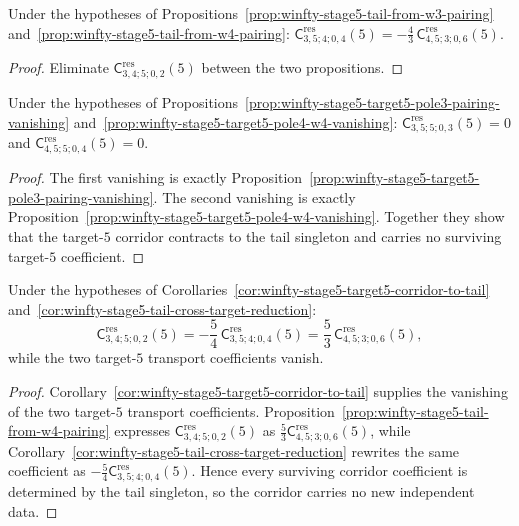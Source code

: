 \begin{corollary}
\label{cor:winfty-stage5-tail-cross-target-reduction}
Under the hypotheses of
Propositions~\ref{prop:winfty-stage5-tail-from-w3-pairing}
and~\ref{prop:winfty-stage5-tail-from-w4-pairing}:
$\mathsf{C}^{\mathrm{res}}_{3,5;4;0,4}(5)
=
-\frac{4}{3}\,
\mathsf{C}^{\mathrm{res}}_{4,5;3;0,6}(5)$.
\end{corollary}

\begin{proof}
Eliminate \(\mathsf{C}^{\mathrm{res}}_{3,4;5;0,2}(5)\) between the two propositions.
\end{proof}

\begin{corollary}
\label{cor:winfty-stage5-target5-corridor-to-tail}
Under the hypotheses of
Propositions~\ref{prop:winfty-stage5-target5-pole3-pairing-vanishing}
and~\ref{prop:winfty-stage5-target5-pole4-w4-vanishing}:
$\mathsf{C}^{\mathrm{res}}_{3,5;5;0,3}(5)=0$ and
$\mathsf{C}^{\mathrm{res}}_{4,5;5;0,4}(5)=0$.
\end{corollary}

\begin{proof}
The first vanishing is exactly
Proposition~\ref{prop:winfty-stage5-target5-pole3-pairing-vanishing}.
The second vanishing is exactly
Proposition~\ref{prop:winfty-stage5-target5-pole4-w4-vanishing}.
Together they show that the target-$5$ corridor contracts to the
tail singleton and carries no surviving target-$5$ coefficient.
\end{proof}

\begin{corollary}
\label{cor:winfty-stage5-target5-no-new-independent-data}
Under the hypotheses of
Corollaries~\ref{cor:winfty-stage5-target5-corridor-to-tail}
and~\ref{cor:winfty-stage5-tail-cross-target-reduction}:
\[
\mathsf{C}^{\mathrm{res}}_{3,4;5;0,2}(5)
=
-\frac{5}{4}\,\mathsf{C}^{\mathrm{res}}_{3,5;4;0,4}(5)
=
\frac{5}{3}\,\mathsf{C}^{\mathrm{res}}_{4,5;3;0,6}(5),
\]
while the two target-$5$ transport coefficients vanish.
\end{corollary}

\begin{proof}
Corollary~\ref{cor:winfty-stage5-target5-corridor-to-tail}
supplies the vanishing of the two target-$5$ transport coefficients.
Proposition~\ref{prop:winfty-stage5-tail-from-w4-pairing}
expresses
$\mathsf{C}^{\mathrm{res}}_{3,4;5;0,2}(5)$ as
$\frac{5}{3}\mathsf{C}^{\mathrm{res}}_{4,5;3;0,6}(5)$, while
Corollary~\ref{cor:winfty-stage5-tail-cross-target-reduction}
rewrites the same coefficient as
$-\frac{5}{4}\mathsf{C}^{\mathrm{res}}_{3,5;4;0,4}(5)$.
Hence every surviving corridor coefficient is determined by the tail
singleton, so the corridor carries no new independent data.
\end{proof}

